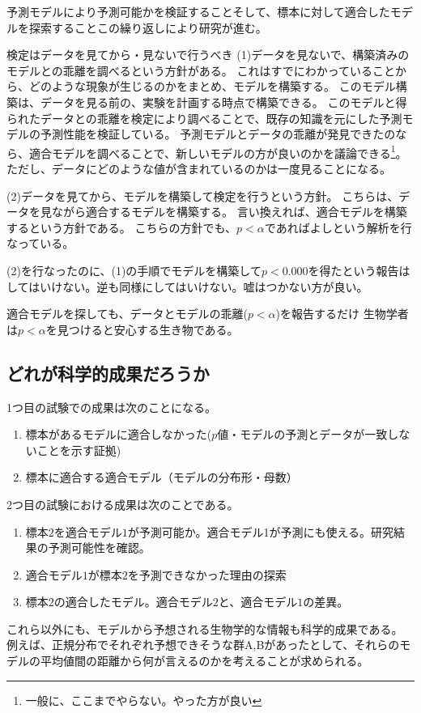 予測モデルにより予測可能かを検証することそして、標本に対して適合したモデルを探索することこの繰り返しにより研究が進む。


\begin{SMbox}{検定はデータを見てから・見ないで行うべき}
    (1)データを見ないで、構築済みのモデルとの乖離を調べるという方針がある。
    これはすでにわかっていることから、どのような現象が生じるのかをまとめ、モデルを構築する。
    このモデル構築は、データを見る前の、実験を計画する時点で構築できる。
    このモデルと得られたデータとの乖離を検定により調べることで、既存の知識を元にした予測モデルの予測性能を検証している。
    予測モデルとデータの乖離が発見できたのなら、適合モデルを調べることで、新しいモデルの方が良いのかを議論できる\footnote{一般に、ここまでやらない。やった方が良い}。
    ただし、データにどのような値が含まれているのかは一度見ることになる。

    (2)データを見てから、モデルを構築して検定を行うという方針。
    こちらは、データを見ながら適合するモデルを構築する。
    言い換えれば、適合モデルを構築するという方針である。
    こちらの方針でも、$p<\alpha$であればよしという解析を行なっている。
    

    (2)を行なったのに、(1)の手順でモデルを構築して$p<0.000$を得たという報告はしてはいけない。逆も同様にしてはいけない。嘘はつかない方が良い。
\end{SMbox}

\begin{SMbox}{適合モデルを探しても、データとモデルの乖離($p<\alpha$)を報告するだけ}
    生物学者は$p<\alpha$を見つけると安心する生き物である。
\end{SMbox}


\subsection{どれが科学的成果だろうか}
1つ目の試験での成果は次のことになる。
\begin{enumerate}
    \item 標本があるモデルに適合しなかった($p$値・モデルの予測とデータが一致しないことを示す証拠)
    \item 標本に適合する適合モデル（モデルの分布形・母数）
\end{enumerate}

2つ目の試験における成果は次のことである。
\begin{enumerate}
    \item 標本$2$を適合モデル$1$が予測可能か。適合モデル1が予測にも使える。研究結果の予測可能性を確認。
    \item 適合モデル$1$が標本$2$を予測できなかった理由の探索
    \item 標本$2$の適合したモデル。適合モデル$2$と、適合モデル$1$の差異。
\end{enumerate}
これら以外にも、モデルから予想される生物学的な情報も科学的成果である。
例えば、正規分布でそれぞれ予想できそうな群A,Bがあったとして、それらのモデルの平均値間の距離から何が言えるのかを考えることが求められる。




